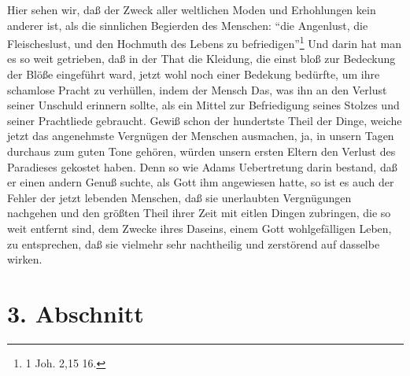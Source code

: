 Hier sehen wir, daß der Zweck aller weltlichen Moden und Erhohlungen kein
anderer ist, als die sinnlichen Begierden des Menschen: "`die Angenlust, die
Fleischeslust, und den Hochmuth des Lebens zu befriedigen"'\footnote{1 Joh. 2,15
16.} Und darin hat man es so weit getrieben, daß in der That die Kleidung, die
einst bloß zur Bedeckung der Blöße eingeführt ward, jetzt wohl noch einer
Bedekung bedürfte, um ihre schamlose Pracht zu verhüllen, indem der Mensch Das,
was ihn an den Verlust seiner Unschuld erinnern sollte, als ein Mittel zur
Befriedigung seines Stolzes und seiner Prachtliede gebraucht. Gewiß schon der
hundertste Theil der Dinge, weiche jetzt das angenehmste Vergnügen der Menschen
ausmachen, ja, in unsern Tagen durchaus zum guten Tone gehören, würden unsern
ersten Eltern den Verlust des Paradieses gekostet haben. Denn so wie Adams
Uebertretung darin bestand, daß er einen andern Genuß suchte, als Gott ihm
angewiesen hatte, so ist es auch der Fehler der jetzt lebenden Menschen, daß sie
unerlaubten Vergnügungen nachgehen und den größten Theil ihrer Zeit mit eitlen
Dingen zubringen, die so weit entfernt sind, dem Zwecke ihres Daseins, einem
Gott wohlgefälligen Leben, zu entsprechen, daß sie vielmehr sehr nachtheilig und
zerstörend auf dasselbe wirken.

\section{3. Abschnitt} \label{kap17_ab3}

